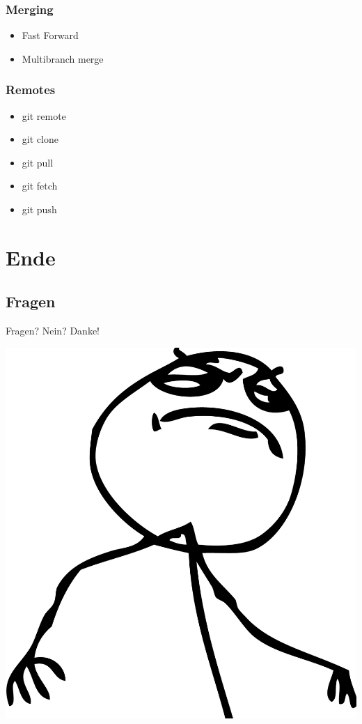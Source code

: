 \documentclass{beamer}
\begin{document}
			\begin{frame}
				\frametitle{Merging}

				\begin{itemize}
					\item{Fast Forward}
					\item{Multibranch merge}
				\end{itemize}
			\end{frame}

			\begin{frame}
				\frametitle{Remotes}

				\begin{itemize}
					\item{git remote}
					\item{git clone}
					\item{git pull}
					\item{git fetch}
					\item{git push}
				\end{itemize}
			\end{frame}

	\section{Ende}
		\subsection{Fragen}

			\begin{frame}
				Fragen? Nein? Danke!

				\begin{center}
					\includegraphics[height=0.4\textheight]{img/fuck-yeah}
				\end{center}
			\end{frame}
\end{document}
